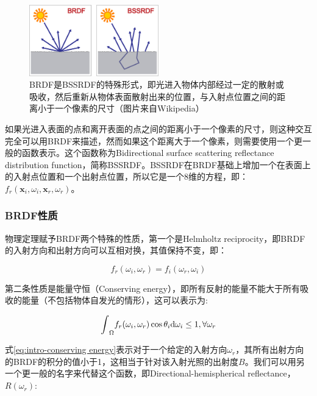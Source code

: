 \begin{figure}
	\sidecaption
	\includegraphics[width=0.5\textwidth]{figures/intro/BSSDF}
	\caption{BRDF是BSSRDF的特殊形式，即光进入物体内部经过一定的散射或吸收，然后重新从物体表面散射出来的位置，与入射点位置之间的距离小于一个像素的尺寸（图片来自Wikipedia）}
	\label{f:intro-bssrdf-1}
\end{figure}

如果光进入表面的点和离开表面的点之间的距离小于一个像素的尺寸，则这种交互完全可以用BRDF来描述，然而如果这个距离大于一个像素，则需要使用一个更一般的函数表示。这个函数称为Bidirectional surface scattering reflectance distribution function，简称BSSRDF\cite{a:GeometricConsiderationsandNomenclatureforReflectance}。BSSRDF在BRDF基础上增加一个在表面上的入射点位置和一个出射点位置，所以它是一个8维的方程，即：$f_r(\mathbf{x}_i,\omega_i,\mathbf{x}_r,\omega_r)$。




\subsubsection{BRDF性质}
物理定理赋予BRDF两个特殊的性质，第一个是Helmholtz reciprocity，即BRDF的入射方向和出射方向可以互相对换，其值保持不变，即：

\begin{equation}
	f_r(\omega_i,\omega_r)=f_i(\omega_r,\omega_i)
\end{equation}

第二条性质是能量守恒（Conserving energy），即所有反射的能量不能大于所有吸收的能量（不包括物体自发光的情形），这可以表示为:

\begin{equation}\label{eq:intro-conserving energy}
	{\rm \int}_{\Omega}f_r(\omega_i,\omega_r)\cos\theta_i {\rm d}\omega_i \leq 1,\forall\omega_r
\end{equation}

\noindent 式\ref{eq:intro-conserving energy}表示对于一个给定的入射方向$\omega_r$，其所有出射方向的BRDF的积分的值小于1，这相当于针对该入射光照的出射度$B$。我们可以用另一个更一般的名字来代替这个函数，即Directional-hemispherical reflectance，$R(\omega_r)$:

